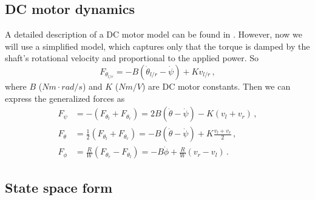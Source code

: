 \documentclass[a4paper]{article}
\newcommand{\pitch}{\psi}
\newcommand{\yaw}{\phi}
\newcommand{\roll}{\theta}
\begin{document}
\subsection{DC motor dynamics}

A detailed description of a DC motor model can be found in
\cite{robot-modeling}. However, now we will use a simplified model, which
captures only that the torque is damped by the shaft's rotational velocity
and proportional to the applied power. So
\begin{equation}
    F_{\roll_{l/r}} = -B (\dot\roll_{l/r} - \dot\pitch)
                       + K v_{l/r}
    \,,
\end{equation}
where $B$ ($Nm \cdot rad/s$) and $K$ ($Nm / V$) are DC motor constants.
Then we can express the generalized forces as
\begin{equation} \begin{split}
    F_\pitch &= -(F_{\roll_l} + F_{\roll_r})
              = 2 B (\dot\roll - \dot\pitch) - K(v_l + v_r)
    \,, \\
    F_\roll &= \frac{1}{2}(F_{\roll_l} + F_{\roll_r})
             = -B (\dot\roll - \dot\pitch) + K \frac{v_l + v_r}{2}
    \,, \\
    F_\yaw &= \frac{R}{W}(F_{\roll_r} - F_{\roll_l})
            = -B \dot\yaw + \frac{R}{W} (v_r - v_l)
    \,.
\end{split} \end{equation}

\subsection{State space form}
\end{document}
